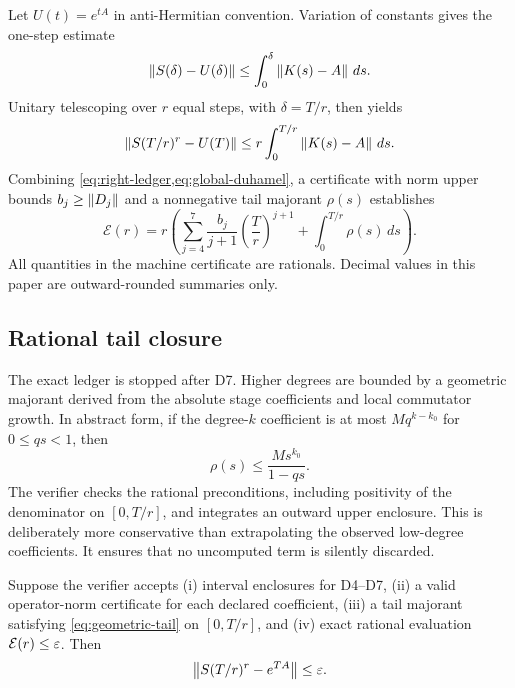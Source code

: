 Let $U(t)=e^{tA}$ in anti-Hermitian convention.  Variation of constants gives
the one-step estimate
\begin{equation}
 \left\lVert S(\delta)-U(\delta)\right\rVert
 \leq \int_0^\delta \left\lVert K(s)-A\right\rVert\,ds.
 \label{eq:one-step-duhamel}
\end{equation}
Unitary telescoping over $r$ equal steps, with $\delta=T/r$, then yields
\begin{equation}
 \left\lVert S(T/r)^r-U(T)\right\rVert
 \leq r\int_0^{T/r}\left\lVert K(s)-A\right\rVert\,ds.
 \label{eq:global-duhamel}
\end{equation}
Combining \cref{eq:right-ledger,eq:global-duhamel}, a certificate with norm
upper bounds $b_j\geq\left\lVert D_j\right\rVert$ and a nonnegative tail majorant $\rho(s)$
establishes
\begin{equation}
 \mathcal E(r)=
 r\left(\sum_{j=4}^{7}\frac{b_j}{j+1}
                  \left(\frac{T}{r}\right)^{j+1}
 +\int_0^{T/r}\rho(s)\,ds\right).
 \label{eq:finite-step-bound}
\end{equation}
All quantities in the machine certificate are rationals.  Decimal values in
this paper are outward-rounded summaries only.

\subsection{Rational tail closure}

The exact ledger is stopped after D7.  Higher degrees are bounded by a
geometric majorant derived from the absolute stage coefficients and local
commutator growth.  In abstract form, if the degree-$k$ coefficient is at most
$M q^{k-k_0}$ for $0\leq q s<1$, then
\begin{equation}
 \rho(s)\leq \frac{M s^{k_0}}{1-qs}.
 \label{eq:geometric-tail}
\end{equation}
The verifier checks the rational preconditions, including positivity of the
denominator on $[0,T/r]$, and integrates an outward upper enclosure.  This is
deliberately more conservative than extrapolating the observed low-degree
coefficients.  It ensures that no uncomputed term is silently discarded.

\begin{theorem}
\label{thm:soundness}
Suppose the verifier accepts (i) interval enclosures for D4--D7, (ii) a valid
operator-norm certificate for each declared coefficient, (iii) a tail
majorant satisfying \cref{eq:geometric-tail} on $[0,T/r]$, and (iv) exact
rational evaluation $\mathcal E(r)\leq\varepsilon$.  Then
\begin{equation}
  \left\lVert S(T/r)^r-e^{TA}\right\rVert\leq\varepsilon.
\end{equation}
\end{theorem}

